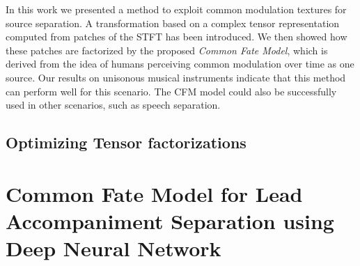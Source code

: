 In this work we presented a method to exploit common modulation textures for source separation. A transformation based on a complex tensor representation computed from patches of the STFT has been introduced. We then showed how these patches are factorized by the proposed \emph{Common Fate Model}, which is derived from the idea of humans perceiving common modulation over time as one source. Our results on unisonous musical instruments indicate that this method can perform well for this scenario. The CFM model could also be successfully used in other scenarios, such as speech separation.

\subsection{Optimizing Tensor factorizations}

%
%
%

\section{Common Fate Model for Lead Accompaniment Separation using Deep Neural Network}


